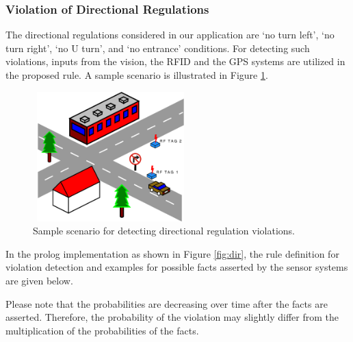 \documentclass[a4paper,oneside,12pt]{report}
\begin{document}
\subsubsection{Violation of Directional Regulations}
The directional regulations considered in our application are `no turn left', `no turn right', `no U turn', and `no entrance' conditions. For detecting such violations, inputs from the vision, the RFID and the GPS systems are utilized in the proposed rule. A sample scenario is illustrated in Figure \ref{fig:dirreg}.

\begin{figure}[ht]
\begin{center}
\includegraphics[width=60mm,height=50mm]{img/rfid2.eps}
\caption{Sample scenario for detecting directional regulation violations.}
\label{fig:dirreg}
\end{center}
\end{figure}

In the prolog implementation as shown in Figure \ref{fig:dir}, the rule definition for violation detection and examples for possible facts asserted by the sensor systems are given below. 

Please note that the probabilities are decreasing over time after the facts are asserted. Therefore, the probability of the violation may slightly differ from the multiplication of the probabilities of the facts.
\end{document}
